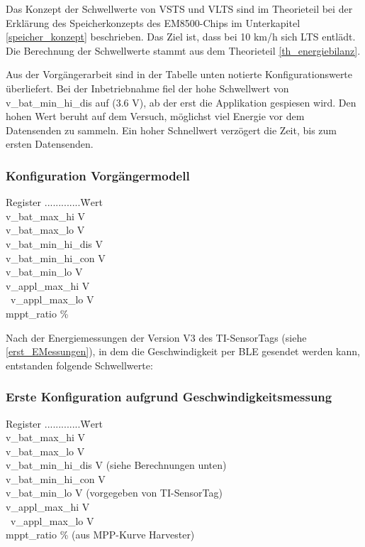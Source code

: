 Das Konzept der Schwellwerte von VSTS und VLTS sind im Theorieteil bei der Erklärung des Speicherkonzepts des EM8500-Chips im Unterkapitel \ref{speicher_konzept} beschrieben. Das Ziel ist, dass bei 10 km/h sich LTS entlädt. Die Berechnung der Schwellwerte stammt aus dem Theorieteil \ref{th_energiebilanz}.




Aus der Vorgängerarbeit sind in der Tabelle unten notierte Konfigurationswerte überliefert. Bei der Inbetriebnahme fiel der hohe Schwellwert von v\_bat\_min\_hi\_dis auf (3.6 V), ab der erst die Applikation gespiesen wird. Den hohen Wert beruht auf dem Versuch, möglichst viel Energie vor dem Datensenden zu sammeln. Ein hoher Schnellwert verzögert die Zeit, bis zum ersten Datensenden.

\subsubsection*{Konfiguration Vorgängermodell}
\begin{tabbing}
    Register .............\quad\= Wert \\[0.8ex]
    v\_bat\_max\_hi        V \\
    v\_bat\_max\_lo        V \\
    v\_bat\_min\_hi\_dis   V \\
    v\_bat\_min\_hi\_con   V \\
    v\_bat\_min\_lo        V \\
    v\_appl\_max\_hi       V \\\
    v\_appl\_max\_lo       V \\ 
    mppt\_ratio            \thinspace\% \\
\end{tabbing}

Nach der Energiemessungen der Version V3 des TI-SensorTags (siehe \ref{erst_EMessungen}), in dem die Geschwindigkeit per BLE gesendet werden kann, entstanden folgende Schwellwerte:

\subsubsection*{Erste Konfiguration aufgrund Geschwindigkeitsmessung}
\begin{tabbing}
    Register .............\quad\= Wert \\[0.8ex]
    v\_bat\_max\_hi        V \\
    v\_bat\_max\_lo        V \\
    v\_bat\_min\_hi\_dis   V (siehe Berechnungen unten)\\
    v\_bat\_min\_hi\_con   V \\
    v\_bat\_min\_lo        V (vorgegeben von TI-SensorTag)\\
    v\_appl\_max\_hi      \> 3.8 V \\\
    v\_appl\_max\_lo       V \\ 
    mppt\_ratio            \> 50\thinspace\% (aus MPP-Kurve Harvester)\\
\end{tabbing}

